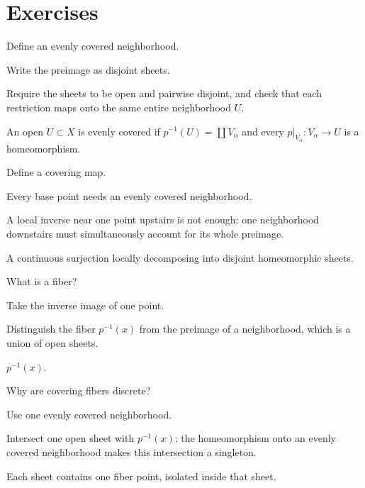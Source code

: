 \section{Exercises}

\begin{exercise}\label{exr:viii10-01}
Define an evenly covered neighborhood.
\end{exercise}
\begin{hint}
Write the preimage as disjoint sheets.

Require the sheets to be open and pairwise disjoint, and check that each restriction maps onto the same entire neighborhood \(U\).
\end{hint}
\begin{solution}
An open \(U\subset X\) is evenly covered if \(p^{-1}(U)=\coprod V_\alpha\) and every \(p|_{V_\alpha}:V_\alpha\to U\) is a homeomorphism.
\end{solution}

\begin{exercise}\label{exr:viii10-02}
Define a covering map.
\end{exercise}
\begin{hint}
Every base point needs an evenly covered neighborhood.

A local inverse near one point upstairs is not enough: one neighborhood downstairs must simultaneously account for its whole preimage.
\end{hint}
\begin{solution}
A continuous surjection locally decomposing into disjoint homeomorphic sheets.
\end{solution}

\begin{exercise}\label{exr:viii10-03}
What is a fiber?
\end{exercise}
\begin{hint}
Take the inverse image of one point.

Distinguish the fiber \(p^{-1}(x)\) from the preimage of a neighborhood, which is a union of open sheets.
\end{hint}
\begin{solution}
\(p^{-1}(x)\).
\end{solution}

\begin{exercise}\label{exr:viii10-04}
Why are covering fibers discrete?
\end{exercise}
\begin{hint}
Use one evenly covered neighborhood.

Intersect one open sheet with \(p^{-1}(x)\); the homeomorphism onto an evenly covered neighborhood makes this intersection a singleton.
\end{hint}
\begin{solution}
Each sheet contains one fiber point, isolated inside that sheet.
\end{solution}

